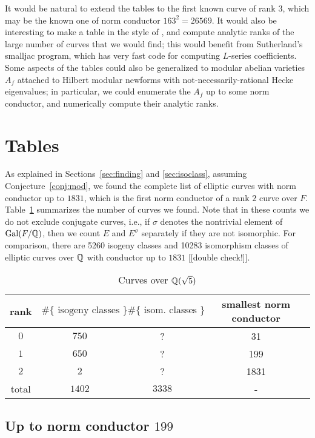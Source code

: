 \documentclass{amsart}
\begin{document}
It would be natural to extend the tables to the first known curve of
rank $3$, which may be the known one of norm conductor $163^2=26569$.
It would also be interesting to make a table in the style of
\cite{stein-watkins:ants5}, and compute analytic ranks of the large
number of curves that we would find; this would benefit from
Sutherland's smalljac program, which has very fast code for computing
$L$-series coefficients.  Some aspects of the tables could also be
generalized to modular abelian varieties $A_f$ attached to Hilbert
modular newforms with not-necessarily-rational Hecke eigenvalues; in
particular, we could enumerate the $A_f$ up to some norm conductor,
and numerically compute their analytic ranks.

\section{Tables}\label{sec:tables}

As explained in Sections~\ref{sec:finding} and \ref{sec:isoclass},
assuming Conjecture~\ref{conj:mod}, we found the complete list of
elliptic curves with norm conductor up to $1831$, which is the first
norm conductor of a rank $2$ curve over $F$.  Table~\ref{table:counts}
summarizes the number of curves we found.  Note that in these counts
we do not exclude conjugate curves, i.e., if $\sigma$ denotes the
nontrivial element of $\operatorname{Gal}(F/\mathbb{Q})$, then we count $E$ and $E^{\sigma}$
separately if they are not isomorphic.  For comparison, 
there are 5260 isogeny classes and 10283 isomorphism classes
of elliptic curves over $\mathbb{Q}$ with conductor up to $1831$ [[double check!]].
\begin{center}
\begin{table}[h]
\caption{Curves over $\mathbb{Q}(\sqrt{5})$\label{table:counts}}
\begin{tabular}{|c|c|c|c|}\hline
rank & $\#\{\text{ isogeny classes }\}$ &  $\#\{\text{ isom. classes }\}$ & smallest norm conductor\\\hline
 $0$ & $750$ & ? & 31\\\hline
 $1$ & $650$ & ? & 199\\\hline
 $2$ & $2$ & ?  & 1831\\\hline
total & $1402$ & $3338$ & - \\\hline
\end{tabular}
\end{table}
\end{center}

\subsection{Up to norm conductor  $199$}\label{sec:to199}
\end{document}
